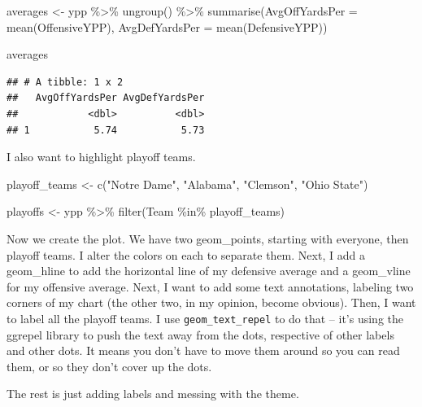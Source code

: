 \documentclass[
]{book}
\newenvironment{Shaded}{\begin{snugshade}}{\end{snugshade}}
\newcommand{\AttributeTok}[1]{\textcolor[rgb]{0.77,0.63,0.00}{#1}}
\newcommand{\FunctionTok}[1]{\textcolor[rgb]{0.00,0.00,0.00}{#1}}
\newcommand{\NormalTok}[1]{#1}
\newcommand{\OtherTok}[1]{\textcolor[rgb]{0.56,0.35,0.01}{#1}}
\newcommand{\SpecialCharTok}[1]{\textcolor[rgb]{0.00,0.00,0.00}{#1}}
\newcommand{\StringTok}[1]{\textcolor[rgb]{0.31,0.60,0.02}{#1}}
\begin{document}
\begin{Shaded}
\begin{Highlighting}[]
\NormalTok{averages }\OtherTok{\textless{}{-}}\NormalTok{ ypp }\SpecialCharTok{\%\textgreater{}\%} \FunctionTok{ungroup}\NormalTok{() }\SpecialCharTok{\%\textgreater{}\%} \FunctionTok{summarise}\NormalTok{(}\AttributeTok{AvgOffYardsPer =} \FunctionTok{mean}\NormalTok{(OffensiveYPP), }\AttributeTok{AvgDefYardsPer =} \FunctionTok{mean}\NormalTok{(DefensiveYPP))}

\NormalTok{averages}
\end{Highlighting}
\end{Shaded}

\begin{verbatim}
## # A tibble: 1 x 2
##   AvgOffYardsPer AvgDefYardsPer
##            <dbl>          <dbl>
## 1           5.74           5.73
\end{verbatim}

I also want to highlight playoff teams.

\begin{Shaded}
\begin{Highlighting}[]
\NormalTok{playoff\_teams }\OtherTok{\textless{}{-}} \FunctionTok{c}\NormalTok{(}\StringTok{"Notre Dame"}\NormalTok{, }\StringTok{"Alabama"}\NormalTok{, }\StringTok{"Clemson"}\NormalTok{, }\StringTok{"Ohio State"}\NormalTok{)}

\NormalTok{playoffs }\OtherTok{\textless{}{-}}\NormalTok{ ypp }\SpecialCharTok{\%\textgreater{}\%} \FunctionTok{filter}\NormalTok{(Team }\SpecialCharTok{\%in\%}\NormalTok{ playoff\_teams)}
\end{Highlighting}
\end{Shaded}

Now we create the plot. We have two geom\_points, starting with everyone, then playoff teams. I alter the colors on each to separate them. Next, I add a geom\_hline to add the horizontal line of my defensive average and a geom\_vline for my offensive average. Next, I want to add some text annotations, labeling two corners of my chart (the other two, in my opinion, become obvious). Then, I want to label all the playoff teams. I use \texttt{geom\_text\_repel} to do that -- it's using the ggrepel library to push the text away from the dots, respective of other labels and other dots. It means you don't have to move them around so you can read them, or so they don't cover up the dots.

The rest is just adding labels and messing with the theme.
\end{document}
